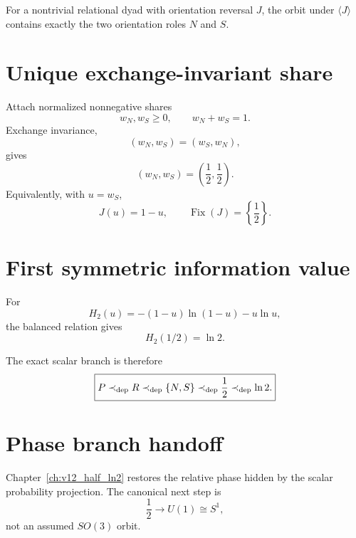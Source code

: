 \begin{theorem}
For a nontrivial relational dyad with orientation reversal $J$, the orbit under $\langle J\rangle$ contains exactly the two orientation roles $N$ and $S$.
\end{theorem}

\section{Unique exchange-invariant share}

Attach normalized nonnegative shares
\begin{equation}
w_N,w_S\ge0,
\qquad
w_N+w_S=1.
\end{equation}
Exchange invariance,
\begin{equation}
(w_N,w_S)=(w_S,w_N),
\end{equation}
gives
\begin{equation}
\boxed{
(w_N,w_S)=\left(\frac12,\frac12\right).
}
\label{eq:v12_unique_half_share}
\end{equation}
Equivalently, with $u=w_S$,
\begin{equation}
J(u)=1-u,
\qquad
\boxed{\operatorname{Fix}(J)=\left\{\frac12\right\}.}
\end{equation}

\section{First symmetric information value}

For
\begin{equation}
H_2(u)=-(1-u)\ln(1-u)-u\ln u,
\end{equation}
the balanced relation gives
\begin{equation}
\boxed{H_2(1/2)=\ln2.}
\label{eq:v12_first_ln2}
\end{equation}

The exact scalar branch is therefore
\begin{equation}
\boxed{
P
\prec_{\rm dep}
R
\prec_{\rm dep}
\{N,S\}
\prec_{\rm dep}
\frac12
\prec_{\rm dep}
\ln2.
}
\label{eq:v12_scalar_foundation}
\end{equation}

\section{Phase branch handoff}

Chapter~\ref{ch:v12_half_ln2} restores the relative phase hidden by the scalar probability projection. The canonical next step is
\begin{equation}
\boxed{
\frac12
\longrightarrow
U(1)\cong S^1,
}
\end{equation}
not an assumed $SO(3)$ orbit.


